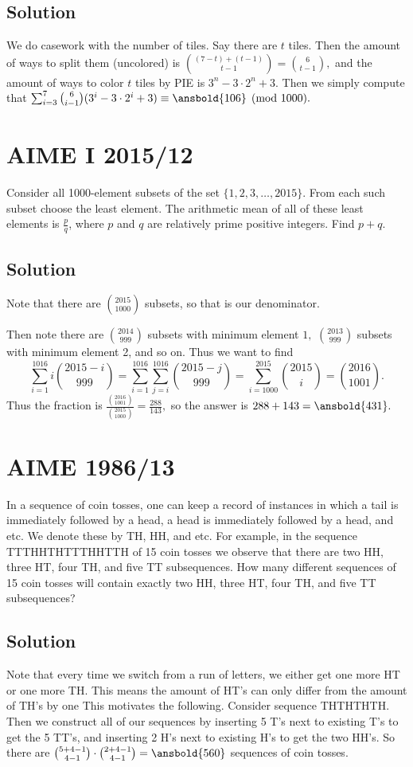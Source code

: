 \documentclass{article}
\begin{document}
\subsection{Solution}
We do casework with the number of tiles. Say there are $t$ tiles. Then the amount of ways to split them (uncolored) is $\binom{(7-t)+(t-1)}{t-1}=\binom{6}{t-1},$ and the amount of ways to color $t$ tiles by PIE is $3^n-3\cdot 2^n+3.$ Then we simply compute that $\sum_{i=3}^{7}\binom{6}{i-1}(3^i-3\cdot 2^i+3)\equiv \ansbold{106}\pmod{1000}.$

\pagebreak\section{AIME I 2015/12}
Consider all 1000-element subsets of the set $\{1, 2, 3,\ldots,2015\}.$ From each such subset choose the least element. The arithmetic mean of all of these least elements is $\frac{p}{q}$, where $p$ and $q$ are relatively prime positive integers. Find $p + q$.

\subsection{Solution}
Note that there are $\binom{2015}{1000}$ subsets, so that is our denominator.

Then note there are $\binom{2014}{999}$ subsets with minimum element $1,$ $\binom{2013}{999}$ subsets with minimum element 2, and so on. Thus we want to find
\[\sum_{i=1}^{1016}i\binom{2015-i}{999}=\sum_{i=1}^{1016}\sum_{j=i}^{1016}\binom{2015-j}{999}=\sum_{i=1000}^{2015}\binom{2015}{i}=\binom{2016}{1001}.\]
Thus the fraction is $\frac{\binom{2016}{1001}}{\binom{2015}{1000}}=\frac{288}{143},$ so the answer is $288+143=\ansbold{431}.$

\pagebreak\section{AIME 1986/13}
In a sequence of coin tosses, one can keep a record of instances in which a tail is immediately followed by a head, a head is immediately followed by a head, and etc. We denote these by TH, HH, and etc. For example, in the sequence TTTHHTHTTTHHTTH of 15 coin tosses we observe that there are two HH, three HT, four TH, and five TT subsequences. How many different sequences of 15 coin tosses will contain exactly two HH, three HT, four TH, and five TT subsequences?

\subsection{Solution}
Note that every time we switch from a run of letters, we either get one more HT or one more TH. This means the amount of HT's can only differ from the amount of TH's by one This motivates the following. Consider sequence THTHTHTH. Then we construct all of our sequences by inserting 5 T's next to existing T's to get the 5 TT's, and inserting 2 H's next to existing H's to get the two HH's. So there are $\binom{5+4-1}{4-1}\cdot\binom{2+4-1}{4-1}=\ansbold{560}$ sequences of coin tosses.
\end{document}
